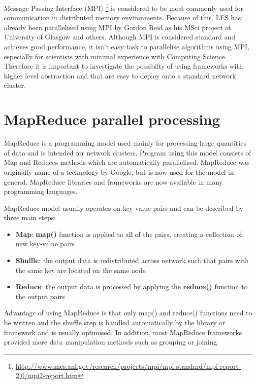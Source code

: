 \documentclass{l4proj}
\begin{document}
Message Passing Interface (MPI) \footnote{\url{http://www.mcs.anl.gov/research/projects/mpi/mpi-standard/mpi-report-2.0/mpi2-report.htm}} 
is considered to be most commonly used for communication in distributed memory environments.
Because of this, LES has already been parallelised using MPI by Gordon Reid as his MSci project at University of Glasgow\cite{les_mpi} and others\cite{les_palm}. Although MPI is considered standard and achieves good performance, it
isn't easy task to parallelise algorithms using MPI, especially for scientists with minimal
experience with Computing Science. Therefore it is important to investigate the possibilty
of using frameworks with higher level abstraction and that are easy to deploy onto a standard
network cluster.

\section{MapReduce parallel processing}

MapReduce is a programming model used mainly for processing large quantities of data
and is intended for network clusters\cite{map_reduce}. Program using this model consists of Map and Reduces
methods which are automatically parallelised. MapReduce was originally name of a technology by
Google, but is now used for the model in general. MapReduce libraries and frameworks are now 
available in many programming languages.

MapReduce model usually operates on key-value pairs and can be described by three main steps:

\begin{itemize}  
\item \textbf{Map}: \textbf{map()} function is applied to all of the pairs, creating a collection of new key-value pairs
\item \textbf{Shuffle}: the output data is redistributed across network such that pairs with the same key are located on the same node
\item \textbf{Reduce}: the output data is processed by applying the \textbf{reduce()} function to the output pairs
\end{itemize}

Advantage of using MapReduce is that only map() and reduce() functions need to be written and
the shuffle step is handled automatically by the library or framework and is usually optimised. 
In addition, most MapReduce frameworks provided more data manipulation methods such as grouping or 
joining.
\end{document}
